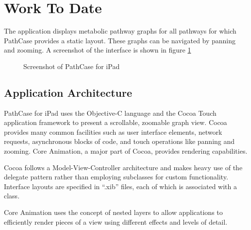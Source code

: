 \section{Work To Date}

The application displays metabolic pathway graphs for all pathways for which PathCase provides a static layout. These graphs can be navigated by panning and zooming. A screenshot of the interface is shown in figure \ref{fig:screenshot}

\begin{figure}[htb]
    \caption{\label{fig:screenshot} Screenshot of PathCase for iPad}
\end{figure}

\subsection{Application Architecture}

PathCase for iPad uses the Objective-C language and the Cocoa Touch application framework to present a scrollable, zoomable graph view. Cocoa provides many common facilities such as user interface elements, network requests, asynchronous blocks of code, and touch operations like panning and zooming. Core Animation, a major part of Cocoa, provides rendering capabilities.

Cocoa follows a Model-View-Controller architecture and makes heavy use of the delegate pattern rather than employing subclasses for custom functionality. Interface layouts are specified in ``.xib'' files, each of which is associated with a class. \cite{ios:application-programming-guide}

Core Animation uses the concept of nested layers to allow applications to efficiently render pieces of a view using different effects and levels of detail.  \cite{ios:core-animation}

